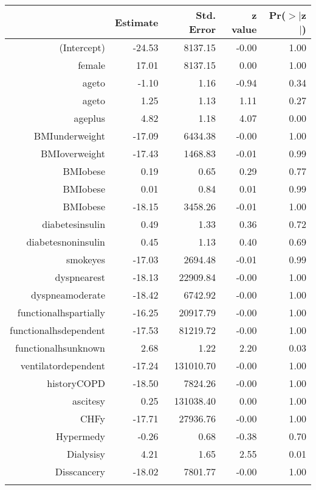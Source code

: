 \bigskip\bigskip
\centering
\begin{tabular}{rrrrr}
  \hline
 & Estimate & Std. Error & z value & Pr($>$$|$z$|$) \\ 
  \hline
(Intercept) & -24.53 & 8137.15 & -0.00 & 1.00 \\ 
  female & 17.01 & 8137.15 & 0.00 & 1.00 \\ 
  age\-65\-to\-74 & -1.10 & 1.16 & -0.94 & 0.34 \\ 
  age\-75\-to\-84 & 1.25 & 1.13 & 1.11 & 0.27 \\ 
  age\-85\-plus & 4.82 & 1.18 & 4.07 & 0.00 \\ 
  BMI\-underweight & -17.09 & 6434.38 & -0.00 & 1.00 \\ 
  BMI\-overweight & -17.43 & 1468.83 & -0.01 & 0.99 \\ 
  BMI\-obese\-1 & 0.19 & 0.65 & 0.29 & 0.77 \\ 
  BMI\-obese\-2 & 0.01 & 0.84 & 0.01 & 0.99 \\ 
  BMI\-obese\-3 & -18.15 & 3458.26 & -0.01 & 1.00 \\ 
  diabetes\-insulin & 0.49 & 1.33 & 0.36 & 0.72 \\ 
  diabetes\-noninsulin & 0.45 & 1.13 & 0.40 & 0.69 \\ 
  smoke\-yes & -17.03 & 2694.48 & -0.01 & 0.99 \\ 
  dyspnea\-rest & -18.13 & 22909.84 & -0.00 & 1.00 \\ 
  dyspnea\-moderate & -18.42 & 6742.92 & -0.00 & 1.00 \\ 
  functional\-hs\-partially & -16.25 & 20917.79 & -0.00 & 1.00 \\ 
  functional\-hs\-dependent & -17.53 & 81219.72 & -0.00 & 1.00 \\ 
  functional\-hs\-unknown & 2.68 & 1.22 & 2.20 & 0.03 \\ 
  ventilator\-dependent & -17.24 & 131010.70 & -0.00 & 1.00 \\ 
  history\-COPD & -18.50 & 7824.26 & -0.00 & 1.00 \\ 
  ascites\-y & 0.25 & 131038.40 & 0.00 & 1.00 \\ 
  CHF\-y & -17.71 & 27936.76 & -0.00 & 1.00 \\ 
  Hyper\-med\-y & -0.26 & 0.68 & -0.38 & 0.70 \\ 
  Dialysis\-y & 4.21 & 1.65 & 2.55 & 0.01 \\ 
  Diss\-cancer\-y & -18.02 & 7801.77 & -0.00 & 1.00 \\ 
$$
\end{tabular}
